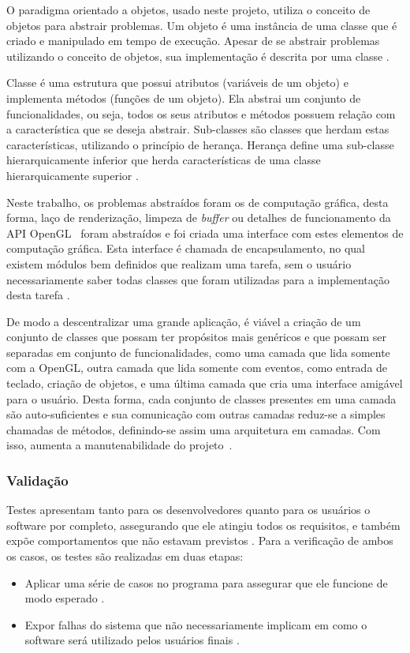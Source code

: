 O paradigma orientado a objetos, usado neste projeto, utiliza o conceito de objetos para abstrair problemas. Um objeto é uma instância de uma classe que é criado e manipulado em tempo de execução. Apesar de se abstrair problemas utilizando o conceito de objetos, sua implementação é descrita por uma classe \cite{poo}. 

Classe é uma estrutura que possui atributos (variáveis de um objeto) e implementa métodos (funções de um objeto). Ela abstrai um conjunto de funcionalidades, ou seja, todos os seus atributos e métodos possuem relação com a característica que se deseja abstrair. Sub-classes são classes que herdam estas características, utilizando o princípio de herança. Herança define uma sub-classe hierarquicamente inferior que herda características de uma classe hierarquicamente superior \cite{poo}.

Neste trabalho, os problemas abstraídos foram os de computação gráfica, desta forma, laço de renderização, limpeza de \emph{buffer} ou detalhes de funcionamento da \acrshort{API} OpenGL~\cite{angel6th,cookbook,sb6,opengl8th,aot4} foram abstraídos e foi criada uma interface com estes elementos de computação gráfica. Esta interface é chamada de encapsulamento, no qual existem módulos bem definidos que realizam uma tarefa, sem o usuário necessariamente saber todas classes que foram utilizadas para a implementação desta tarefa \cite{poo}.

De modo a descentralizar uma grande aplicação, é viável a criação de um conjunto de classes que possam ter propósitos mais genéricos e que possam ser separadas em conjunto de funcionalidades, como uma camada que lida somente com a OpenGL, outra camada que lida somente com eventos, como entrada de teclado, criação de objetos, e uma última camada que cria uma interface amigável para o usuário. Desta forma, cada conjunto de classes presentes em uma camada são auto-suficientes e sua comunicação com outras camadas reduz-se a simples chamadas de métodos, definindo-se assim uma arquitetura em camadas. Com isso, aumenta a manutenabilidade do projeto~\cite{poo}. 

\subsubsection{Validação}

Testes apresentam tanto para os desenvolvedores quanto para os usuários o software por completo, assegurando que ele atingiu todos os requisitos, e também expõe comportamentos que não estavam previstos \cite{sommerville}. Para a verificação de ambos os casos, os testes são realizadas em duas etapas:
\begin{itemize}
\item Aplicar uma série de casos no programa para assegurar que ele funcione de modo esperado \cite{sommerville}.
\item Expor falhas do sistema que não necessariamente implicam em como o software será utilizado pelos usuários finais \cite{sommerville}. 
\end{itemize}


